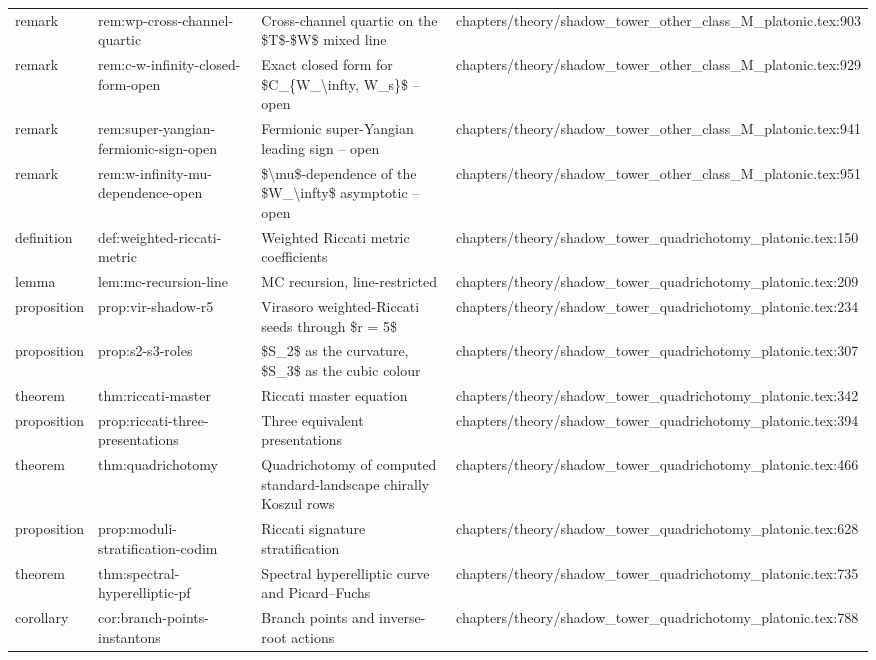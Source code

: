 \documentclass[11pt]{article}
\begin{document}
\begin{longtable}{L{0.10\textwidth}L{0.26\textwidth}L{0.42\textwidth}L{0.22\textwidth}}
remark & rem:wp-cross-channel-quartic & Cross-channel quartic on the \$T\$-\$W\$ mixed line & chapters/theory/shadow\_tower\_other\_class\_M\_platonic.tex:903\\
remark & rem:c-w-infinity-closed-form-op{}en & Exact closed form for \$C\_\{W\_\textbackslash{}infty, W\_s\}\$ -- op{}en & chapters/theory/shadow\_tower\_other\_class\_M\_platonic.tex:929\\
remark & rem:super-yangian-fermionic-sign-op{}en & Fermionic super-Yangian leading sign -- op{}en & chapters/theory/shadow\_tower\_other\_class\_M\_platonic.tex:941\\
remark & rem:w-infinity-mu-dependence-op{}en & \$\textbackslash{}mu\$-dependence of the \$W\_\textbackslash{}infty\$ asymptotic -- op{}en & chapters/theory/shadow\_tower\_other\_class\_M\_platonic.tex:951\\
definition & def:weighted-riccati-metric & Weighted Riccati metric coefficients & chapters/theory/shadow\_tower\_quadrichotomy\_platonic.tex:150\\
lemma & lem:mc-recursion-line & MC recursion, line-restricted & chapters/theory/shadow\_tower\_quadrichotomy\_platonic.tex:209\\
proposition & prop:vir-shadow-r5 & Virasoro weighted-Riccati seeds through \$r = 5\$ & chapters/theory/shadow\_tower\_quadrichotomy\_platonic.tex:234\\
proposition & prop:s2-s3-roles & \$S\_2\$ as the curvature, \$S\_3\$ as the cubic colour & chapters/theory/shadow\_tower\_quadrichotomy\_platonic.tex:307\\
theorem & thm:riccati-master & Riccati master equation & chapters/theory/shadow\_tower\_quadrichotomy\_platonic.tex:342\\
proposition & prop:riccati-three-presentations & Three equivalent presentations & chapters/theory/shadow\_tower\_quadrichotomy\_platonic.tex:394\\
theorem & thm:quadrichotomy & Quadrichotomy of computed standard-landscape chirally Koszul rows & chapters/theory/shadow\_tower\_quadrichotomy\_platonic.tex:466\\
proposition & prop:moduli-stratification-codim & Riccati signature stratification & chapters/theory/shadow\_tower\_quadrichotomy\_platonic.tex:628\\
theorem & thm:spectral-hyperelliptic-pf & Spectral hyperelliptic curve and Picard--Fuchs & chapters/theory/shadow\_tower\_quadrichotomy\_platonic.tex:735\\
corollary & cor:branch-points-instantons & Branch points and inverse-root actions & chapters/theory/shadow\_tower\_quadrichotomy\_platonic.tex:788\\

\end{longtable}
\end{document}
